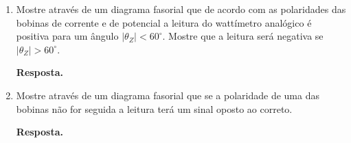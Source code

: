 \documentclass[a4paper,12pt,oneside,openany,table,xcdraw]{article}
\begin{document}
\begin{enumerate}[1)]
\begin{table}[H]\scriptsize
\centering
\def\arraystretch{1.35}
\captionsetup{font=scriptsize}
\caption{Cálculo de $W_1$ e $W_2$ analiticamente.}

\label{w}
\end{table}

\item  Mostre através de um diagrama fasorial que de acordo com as polaridades das bobinas de corrente e de potencial a leitura do wattímetro analógico é positiva para um ângulo $| \theta_Z| < 60^\circ$. Mostre que a leitura será negativa se $| \theta_Z| > 60^\circ$. \vspace{0.8mm}

\textbf{Resposta.} 

\item  Mostre através de um diagrama fasorial que se a polaridade de uma das bobinas não for seguida a leitura terá um sinal oposto ao correto.  \vspace{0.8mm}

\textbf{Resposta.} 


\end{enumerate}
\end{document}
